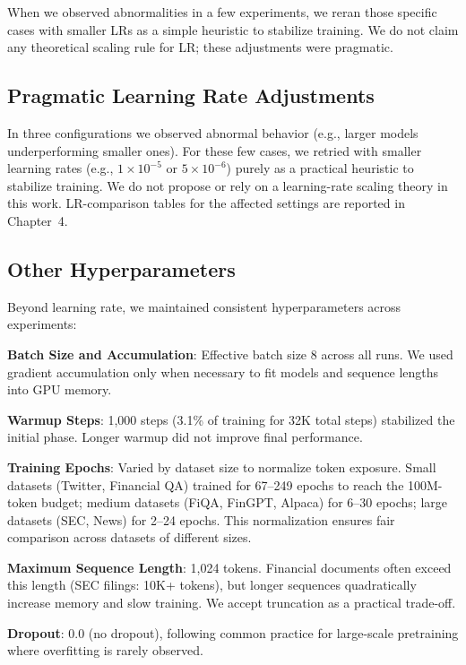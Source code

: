 When we observed abnormalities in a few experiments, we reran those specific cases with smaller LRs as a simple heuristic to stabilize training. We do not claim any theoretical scaling rule for LR; these adjustments were pragmatic.

\subsection{Pragmatic Learning Rate Adjustments}

In three configurations we observed abnormal behavior (e.g., larger models underperforming smaller ones). For these few cases, we retried with smaller learning rates (e.g., $1\times 10^{-5}$ or $5\times 10^{-6}$) purely as a practical heuristic to stabilize training. We do not propose or rely on a learning-rate scaling theory in this work. LR-comparison tables for the affected settings are reported in Chapter~4.

\subsection{Other Hyperparameters}

Beyond learning rate, we maintained consistent hyperparameters across experiments:

\textbf{Batch Size and Accumulation}: Effective batch size 8 across all runs. We used gradient accumulation only when necessary to fit models and sequence lengths into GPU memory.

\textbf{Warmup Steps}: 1,000 steps (3.1\% of training for 32K total steps) stabilized the initial phase. Longer warmup did not improve final performance.

\textbf{Training Epochs}: Varied by dataset size to normalize token exposure. Small datasets (Twitter, Financial QA) trained for 67--249 epochs to reach the 100M-token budget; medium datasets (FiQA, FinGPT, Alpaca) for 6--30 epochs; large datasets (SEC, News) for 2--24 epochs. This normalization ensures fair comparison across datasets of different sizes.

\textbf{Maximum Sequence Length}: 1,024 tokens. Financial documents often exceed this length (SEC filings: 10K+ tokens), but longer sequences quadratically increase memory and slow training. We accept truncation as a practical trade-off.

\textbf{Dropout}: 0.0 (no dropout), following common practice for large-scale pretraining where overfitting is rarely observed.

